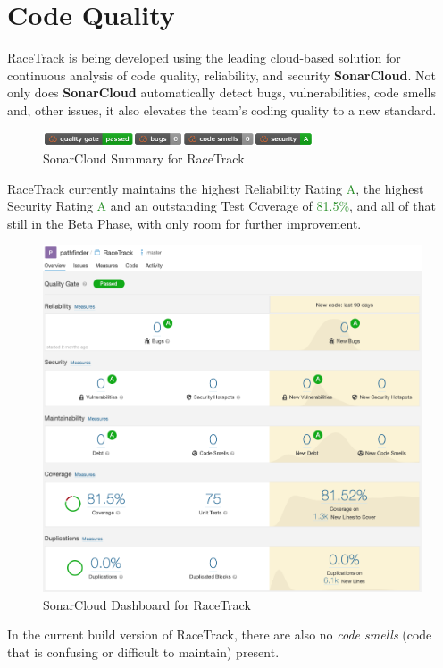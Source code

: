 \section{Code Quality}
	RaceTrack is being developed using the leading cloud-based solution for continuous analysis of code quality, reliability, and security \textbf{SonarCloud}. Not only does \textbf{SonarCloud} automatically detect bugs, vulnerabilities, code smells and, other issues, it also elevates the team's coding quality to a new standard. 
	\begin{figure}[H]
		\centering
		\includegraphics[width=8cm,keepaspectratio,center]{img/Implementation_SonarCloud_Shields.png}
		\caption{SonarCloud Summary for RaceTrack}
	\end{figure}
	RaceTrack currently maintains the highest Reliability Rating \textcolor{ForestGreen}{A}, the highest Security Rating \textcolor{ForestGreen}{A} and an outstanding Test Coverage of \textcolor{ForestGreen}{81.5\%}, and all of that still in the Beta Phase, with only room for further improvement.
	\begin{figure}[H]
		\centering
		\includegraphics[width=16cm,keepaspectratio,center]{img/Implementation_SonarCloud_Dashboard.png}
		\caption{SonarCloud Dashboard for RaceTrack}
	\end{figure}
	In the current build version of RaceTrack, there are also no \textit{code smells} (code that is confusing or difficult to maintain) present.
